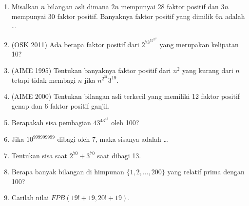 \documentclass[11pt]{scrartcl}
\begin{document}
\begin{enumerate}
                    \item Misalkan $n$ bilangan asli dimana $2n$ mempunyai 28 faktor positif dan $3n$ mempunyai 30 faktor positif. Banyaknya faktor positif yang dimilik $6n$ adalah \dots
                    
                    \item (OSK 2011) Ada berapa faktor positif dari $2^73^55^37^2$ yang merupakan kelipatan 10?
                    
                    \item (AIME 1995) Tentukan banyaknya faktor positif dari $n^2$ yang kurang dari $n$ tetapi tidak membagi $n$ jika $n^{2^{31}}3^{19}.$
                    
                    \item (AIME 2000) Tentukan bilangan asli terkecil yang memiliki 12 faktor positif genap dan $6$ faktor positif ganjil.
                    
                    \item Berapakah sisa pembagian $43^{43^{43}}$ oleh 100?
                    
                    \item Jika $10^{999999999}$ dibagi oleh 7, maka sisanya adalah \dots
                    
                    \item Tentukan sisa saat $2^{70}+3^{70}$ saat dibagi 13.
                    
                    \item Berapa banyak bilangan di himpunan $\{1,2,\dots,200\}$ yang relatif prima dengan 100?
                    
                    \item Carilah nilai $FPB(19!+19,20!+19).$
        \end{enumerate}
        
\end{document}
